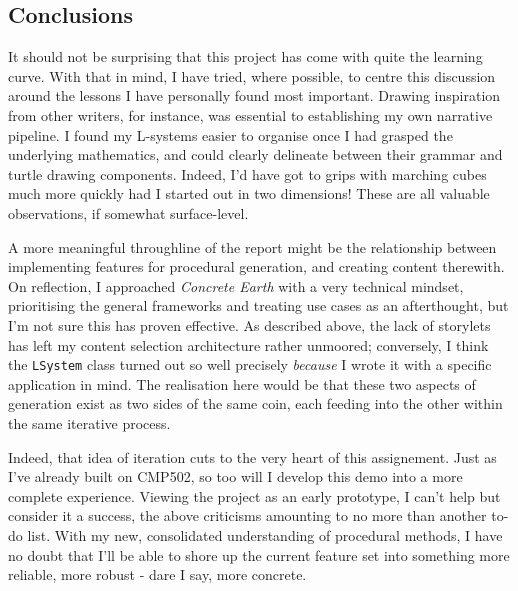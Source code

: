 \documentclass[a4paper, 11pt]{article}
\begin{document}
\begin{flushleft}
\section{Conclusions}

It should not be surprising that this project has come with quite the learning curve. With that in mind, I have tried, where possible, to centre this discussion around the lessons I have personally found most important. Drawing inspiration from other writers, for instance, was essential to establishing my own narrative pipeline. I found my L-systems easier to organise once I had grasped the underlying mathematics, and could clearly delineate between their grammar and turtle drawing components. Indeed, I'd have got to grips with marching cubes much more quickly had I started out in two dimensions! These are all valuable observations, if somewhat surface-level.

\vspace{5pt}\noindent
A more meaningful throughline of the report might be the relationship between implementing features for procedural generation, and creating content therewith. On reflection, I approached \textit{Concrete Earth} with a very technical mindset, prioritising the general frameworks and treating use cases as an afterthought, but I'm not sure this has proven effective. As described above, the lack of storylets has left my content selection architecture rather unmoored; conversely, I think the \texttt{LSystem} class turned out so well precisely \textit{because} I wrote it with a specific application in mind. The realisation here would be that these two aspects of generation exist as two sides of the same coin, each feeding into the other within the same iterative process.

\vspace{5pt}\noindent
Indeed, that idea of iteration cuts to the very heart of this assignement. Just as I've already built on CMP502, so too will I develop this demo into a more complete experience. Viewing the project as an early prototype, I can't help but consider it a success, the above criticisms amounting to no more than another to-do list. With my new, consolidated understanding of procedural methods, I have no doubt that I'll be able to shore up the current feature set into something more reliable, more robust - dare I say, more concrete.



\newpage


\end{flushleft}
\end{document}
